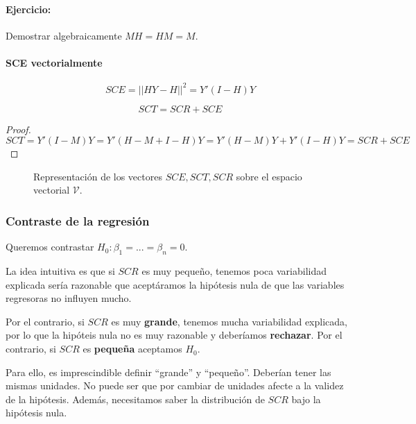 \paragraph{Ejercicio: } Demostrar algebraicamente $MH=HM=M$.

\paragraph{SCE vectorialmente}
\[SCE = ||HY-H||^2 = Y'(I-H)Y\]

\begin{prop}
\[SCT = SCR + SCE\]
\end{prop}

\begin{proof}
\[SCT = Y'(I-M)Y = Y'(H-M+I-H)Y = Y'(H-M)Y + Y'(I-H)Y = SCR + SCE\]
\end{proof}

\begin{figure}[hbtp]
	\centering
	\caption{Representación de los vectores $SCE,SCT,SCR$ sobre el espacio vectorial $\mathcal{V}$.}
\end{figure}

\subsubsection{Contraste de la regresión}
Queremos contrastar $H_0 : β_1 = ... = β_n = 0$.

La idea intuitiva es que si $SCR$ es muy pequeño, tenemos poca variabilidad explicada sería razonable que aceptáramos la hipótesis nula de que las variables regresoras no influyen mucho.

Por el contrario, si $SCR$ es muy \textbf{grande}, tenemos mucha variabilidad explicada, por lo que la hipóteis nula no es muy razonable y deberíamos \textbf{rechazar}. Por el contrario, si $SCR$ es \textbf{pequeña} aceptamos $H_0$.


Para ello, es imprescindible definir ``grande'' y ``pequeño''. Deberían tener las mismas unidades. No puede ser que por cambiar de unidades afecte a la validez de la hipótesis. Además, necesitamos saber la distribución de $SCR$ bajo la hipótesis nula. 

